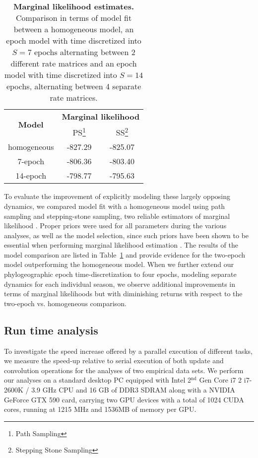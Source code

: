\begin{table}[h!]
\begin{minipage}{\textwidth} 
\centering
\begin{tabular}{ccc}
\hline 
\multirow{2}{*}{\textbf{Model}} & \multicolumn{2}{c}{\textbf{Marginal likelihood}}\tabularnewline
 & PS\footnote{Path Sampling} & SS\footnote{Stepping Stone Sampling}\tabularnewline
\hline 
homogeneous & -827.29 & -825.07\tabularnewline
7-epoch & -806.36  & -803.40 \tabularnewline
14-epoch & -798.77  & -795.63 \tabularnewline
\end{tabular}
\caption{
{ \footnotesize 
{\bf Marginal likelihood estimates.} Comparison in terms of model fit between a homogeneous model, an epoch model with time discretized into $S=7$ epochs alternating between 2 different rate matrices and an epoch model with time discretized into $S=14$ epochs, alternating between 4 separate rate matrices.
} %
}
\label{tab:flu_ps}
\end{minipage}
\end{table}

To evaluate the improvement of explicitly modeling these largely opposing dynamics, we compared model fit with a homogeneous model using path sampling and stepping-stone sampling, two reliable estimators of marginal likelihood \citep{Baele2012}. 
Proper priors were used for all parameters during the various analyses, as well as the model selection, since such priors have been shown to be essential when performing marginal likelihood estimation \citep{Baele2012}.
The results of the model comparison are listed in Table~\ref{tab:flu_ps} and provide evidence for the two-epoch model outperforming the homogeneous model.
When we further extend our phylogeographic epoch time-discretization to four epochs, modeling separate dynamics for each individual season, we observe additional improvements in terms of marginal likelihoods but with diminishing returns with respect to the two-epoch vs. homogeneous comparison. %

\subsection{Run time analysis}

To investigate the speed increase offered by a parallel execution of different tasks, we measure the speed-up relative to serial execution of both update and convolution operations for the analyses of two empirical data sets.
We perform our analyses on a standard desktop PC equipped with Intel 2$^{\text{nd}}$ Gen Core i7 2 i7-2600K / 3.9 GHz CPU and 16 GB of DDR3 SDRAM along with a NVIDIA GeForce GTX 590 card, carrying two GPU devices with a total of 1024 CUDA cores, running at 1215 MHz and 1536MB of memory per GPU. 


